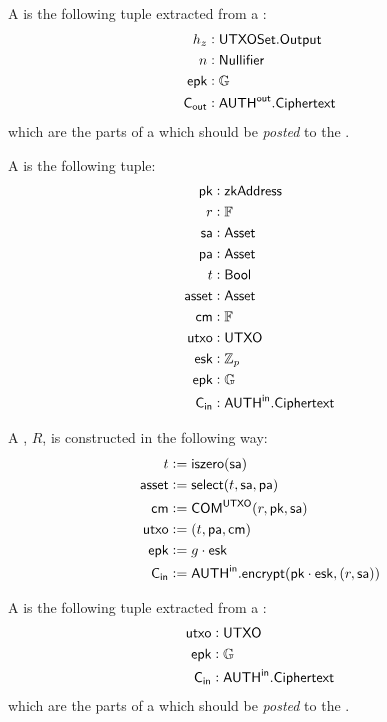 \begin{definition}
    A \SenderPost{} is the following tuple extracted from a \Sender{}:
    \begin{align*}
        h_z   &: {\textsf{UTXOSet}}.{\textsf{Output}} \\
        n     &: {\textsf{Nullifier}} \\
        {\textsf{epk}}  &: {\mathbb{G}} \\
        {\textsf{C}_\textsf{out}} &: {{\textsf{AUTH}}^\textsf{out}}.{\textsf{Ciphertext}}
    \end{align*}
    which are the parts of a \Sender{} which should be \emph{posted} to the \Ledger{}.
\end{definition}

\begin{definition}
    A \Receiver{} is the following tuple:
    \begin{align*}
        {\textsf{pk}}    &: {\textsf{zkAddress}} \\
        r      &: {\mathbb{F}} \\
        {\textsf{sa}}    &: {\textsf{Asset}} \\
        {\textsf{pa}}    &: {\textsf{Asset}} \\
        t      &: {\textsf{Bool}} \\
        {\textsf{asset}} &: {\textsf{Asset}} \\
        {\textsf{cm}}    &: {\mathbb{F}} \\
        {\textsf{utxo}}  &: {\textsf{UTXO}} \\
        {\textsf{esk}}   &: {\mathbb{Z}}_p \\
        {\textsf{epk}}   &: {\mathbb{G}} \\
        {\textsf{C}_\textsf{in}}   &: {{\textsf{AUTH}}^\textsf{in}}.{\textsf{Ciphertext}}
    \end{align*}
    
    A \Receiver{}, $R$, is constructed in the following way:
    \begin{align*}
        t      &:= {\textsf{iszero}}({\textsf{sa}}) \\
        {\textsf{asset}} &:= {\textsf{select}}(t, {\textsf{sa}}, {\textsf{pa}}) \\
        {\textsf{cm}}    &:= {\textsf{COM}}^{{\textsf{UTXO}}}(r, {\textsf{pk}}, {\textsf{sa}}) \\
        {\textsf{utxo}}  &:= (t, {\textsf{pa}}, {\textsf{cm}}) \\
        {\textsf{epk}}   &:= g \cdot {\textsf{esk}} \\
        {\textsf{C}_\textsf{in}}   &:= {{\textsf{AUTH}}^\textsf{in}}.{\textsf{encrypt}}({\textsf{pk}} \cdot {\textsf{esk}}, (r, {\textsf{sa}}))
    \end{align*}
\end{definition}

\begin{definition}
    A \ReceiverPost{} is the following tuple extracted from a \Receiver{}:
    \begin{align*}
        {\textsf{utxo}} &: {\textsf{UTXO}} \\
        {\textsf{epk}}  &: {\mathbb{G}} \\
        {\textsf{C}_\textsf{in}}  &: {{\textsf{AUTH}}^\textsf{in}}.{\textsf{Ciphertext}}
    \end{align*}
    which are the parts of a \Receiver{} which should be \emph{posted} to the \Ledger{}.
\end{definition}

